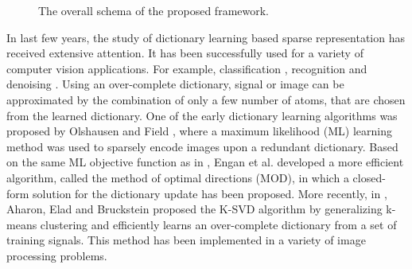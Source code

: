 \documentclass{article}
\begin{document}
\begin{figure*}[t]
\label{fig:fig1}
             \caption{The overall schema of the proposed framework.}
             \end{figure*}

In last few years, the study of dictionary learning based sparse representation has received extensive attention. It has been successfully used for a variety of computer vision applications. For example, classification \cite{huang2006sparse}, recognition \cite{wright2009robust} and denoising \cite{elad2006image}.
 Using an over-complete dictionary, signal or image can be approximated by the combination of only a few number of atoms, that are chosen from the learned dictionary. One of the early dictionary learning algorithms was proposed by Olshausen and Field \cite{olshausen1997sparse}, where a maximum likelihood (ML) learning method was used to sparsely encode images upon a redundant dictionary. Based on the same ML objective function as in \cite{olshausen1997sparse}, Engan et al. \cite{engan1999method} developed a more efficient algorithm, called the method of optimal directions (MOD), in which a closed-form solution for the dictionary update has been proposed. More recently, in \cite{aharon2006svd}, Aharon, Elad and Bruckstein proposed the K-SVD algorithm by generalizing k-means clustering and efficiently learns an over-complete dictionary from a set of training signals. This method has been implemented in a variety of image processing problems. 
\end{document}
